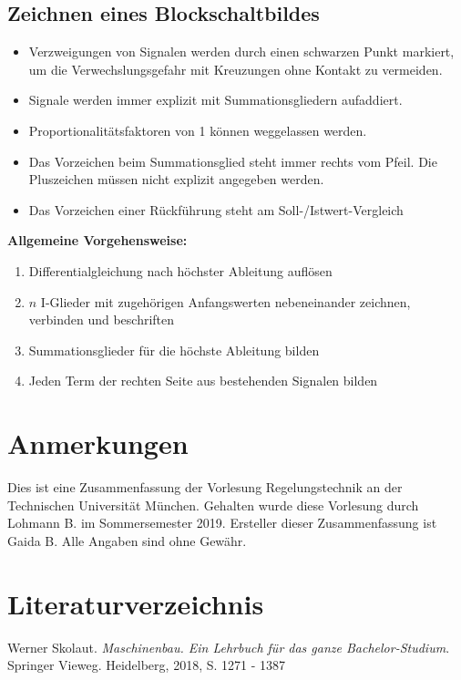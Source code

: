 \documentclass[10pt,a4paper]{article}
\begin{document}
\subsection{Zeichnen eines Blockschaltbildes}
\begin{itemize}
	\item Verzweigungen von Signalen werden durch einen schwarzen Punkt markiert, um die Verwechslungsgefahr mit Kreuzungen ohne Kontakt zu vermeiden.
	\item Signale werden immer explizit mit Summationsgliedern aufaddiert.
	\item Proportionalitätsfaktoren von 1 können weggelassen werden.
	\item Das Vorzeichen beim Summationsglied steht immer rechts vom Pfeil. Die Pluszeichen müssen nicht explizit angegeben werden.
	\item Das Vorzeichen einer Rückführung steht am Soll-/Istwert-Vergleich
\end{itemize}
\textbf{Allgemeine Vorgehensweise:}
\begin{enumerate}
	\item Differentialgleichung nach höchster Ableitung auflösen
	\item $n$ I-Glieder mit zugehörigen Anfangswerten nebeneinander zeichnen, verbinden und beschriften
	\item Summationsglieder für die höchste Ableitung bilden
	\item Jeden Term der rechten Seite aus bestehenden Signalen bilden
\end{enumerate}





\pagebreak
\section*{Anmerkungen}
Dies ist eine Zusammenfassung der Vorlesung Regelungstechnik an der Technischen Universität München.
Gehalten wurde diese Vorlesung durch Lohmann B. im Sommersemester 2019.
Ersteller dieser Zusammenfassung ist Gaida B.
Alle Angaben sind ohne Gewähr.


\section*{Literaturverzeichnis}
Werner Skolaut. \textit{Maschinenbau. Ein Lehrbuch für das ganze Bachelor-Studium}. Springer Vieweg. Heidelberg, 2018, S. 1271 - 1387
\end{document}

